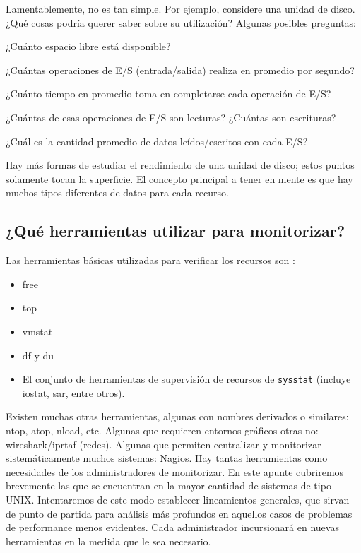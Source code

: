 \documentclass[12pt]{article}
\begin{document}
Lamentablemente, no es tan simple. Por ejemplo, considere una unidad de 
disco. ¿Qué cosas podría querer saber sobre su utilización? Algunas posibles
preguntas: 

¿Cuánto espacio libre está disponible?

¿Cuántas operaciones de E/S (entrada/salida) realiza en promedio por
segundo?

¿Cuánto tiempo en promedio toma en completarse cada operación de E/S?

¿Cuántas de esas operaciones de E/S son lecturas? ¿Cuántas son escrituras?

¿Cuál es la cantidad promedio de datos leídos/escritos con cada E/S?

Hay más formas de estudiar el rendimiento de una unidad de disco; estos 
puntos solamente tocan la superficie. El concepto principal a tener en 
mente es que hay muchos tipos diferentes de datos para cada recurso.


\subsection*{¿Qué herramientas utilizar para monitorizar?}

Las herramientas básicas utilizadas para verificar los recursos son :
\begin{itemize}
\item free
\item top
\item vmstat
\item df y du 
\item El conjunto de herramientas de supervisión de recursos de 
\texttt{sysstat} (incluye iostat, sar, entre otros). 
\end{itemize}

Existen muchas otras herramientas, algunas con nombres derivados o 
similares: ntop, atop, nload, etc. Algunas que requieren entornos gráficos
otras no: wireshark/iprtaf (redes). Algunas que permiten centralizar y 
monitorizar sistemáticamente muchos sistemas: Nagios. Hay tantas herramientas
como necesidades de los administradores de monitorizar. En este apunte cubriremos brevemente
las que se encuentran en la mayor cantidad de sistemas de tipo UNIX.
Intentaremos de este modo establecer lineamientos generales, que sirvan
de punto de partida para análisis más profundos en aquellos casos 
de problemas de performance menos evidentes. Cada administrador incursionará 
en nuevas herramientas en la medida que le sea necesario. 
\end{document}
